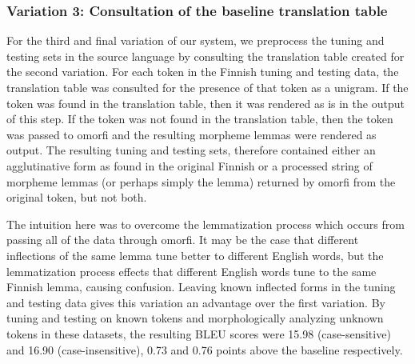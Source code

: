 \subsubsection{Variation 3: Consultation of the baseline translation table}
\label{sec:fienv3}

For the third and final variation of our system, we preprocess the tuning and testing sets in the source language by consulting the translation table created for the second variation.
%
For each token in the Finnish tuning and testing data, the translation table was consulted for the presence of that token as a unigram.
%
If the token was found in the translation table, then it was rendered as is in the output of this step.
%
If the token was not found in the translation table, then the token was passed to omorfi and the resulting morpheme lemmas were rendered as output.
%
The resulting tuning and testing sets, therefore contained either an agglutinative form as found in the original Finnish or a processed string of morpheme lemmas (or perhaps simply the lemma) returned by omorfi from the original token, but not both.

The intuition here was to overcome the lemmatization process which occurs from passing all of the data through omorfi.
%
It may be the case that different inflections of the same lemma tune better to different English words, but the lemmatization process effects that different English words tune to the same Finnish lemma, causing confusion.
%
Leaving known inflected forms in the tuning and testing data gives this variation an advantage over the first variation.
%
By tuning and testing on known tokens and morphologically analyzing unknown tokens in these datasets, the resulting BLEU scores were 15.98 (case-sensitive) and 16.90 (case-insensitive), 0.73 and 0.76 points above the baseline respectively.




%
